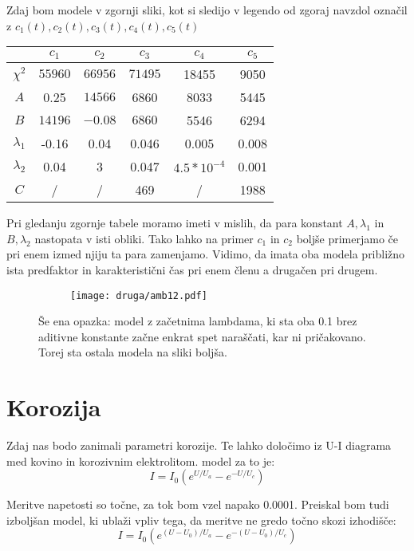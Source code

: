 \documentclass{article}
\begin{document}
Zdaj bom modele v zgornji sliki, kot si sledijo v legendo od zgoraj navzdol označil z $c_1(t), c_2(t), c_3(t), c_4(t), c_5(t)$

\begin{center}
\begin{tabular}{|c|c|c|c|c|c|}
\hline
& $c_1$ & $c_2$ & $c_3$ & $c_4$&  $c_5$\\ \hline
$\chi^2$ & $55960$ & $66956$ & $71495$ & 18455 & 9050\\ \hline
$A$ & 0.25& $14566$ & 6860& 8033 & 5445\\ \hline
$B$ & $14196$ &$-0.08$ & $6860$& 5546 & 6294 \\ \hline
$\lambda_1$ & -0.16 & 0.04 & 0.046& 0.005 & 0.008\\ \hline
$\lambda_2$ & 0.04 & 3 & 0.047& $4.5*10^{-4}$ & 0.001\\ \hline
$C$ & / & / & 469& / & 1988\\ \hline
\end{tabular}
\end{center}

Pri gledanju zgornje tabele moramo imeti v mislih, da para konstant $A,\lambda_1$ in $B,\lambda_2$ nastopata v isti obliki. Tako lahko na primer $c_1$ in $c_2$ boljše primerjamo če pri enem izmed njiju ta para zamenjamo. Vidimo, da imata oba modela približno ista predfaktor in karakteristični čas pri enem členu a drugačen pri drugem.

\begin{figure}[H]
\centering
\begin{subfigure}{.8\textwidth}
\texttt{[image: druga/amb12.pdf]}
\end{subfigure}
\caption*{Še ena opazka: model z začetnima lambdama, ki sta oba 0.1 brez aditivne konstante začne enkrat spet naraščati, kar ni pričakovano. Torej sta ostala modela na sliki boljša.}
\end{figure}
\newpage
\section{Korozija}

Zdaj nas bodo zanimali parametri korozije. Te lahko določimo iz U-I diagrama med kovino in korozivnim elektrolitom. model za to je:
\begin{equation*}
I = I_0( e^{U/U_a} - e^{-U/U_c})
\end{equation*}

Meritve napetosti so točne, za tok bom vzel napako 0.0001.
Preiskal bom tudi izboljšan model, ki ublaži vpliv tega, da meritve ne gredo točno skozi izhodišče:
\begin{equation*}
I = I_0( e^{(U-U_0)/U_a} - e^{-(U-U_0)/U_c})
\end{equation*}
\end{document}
